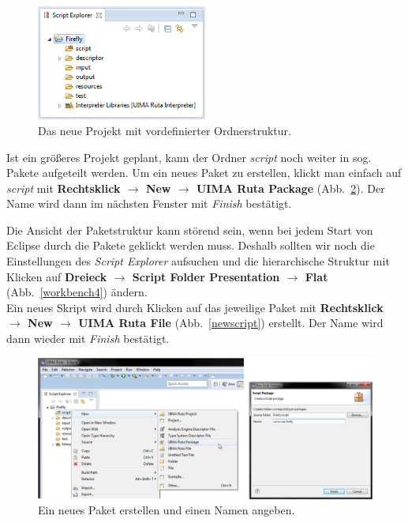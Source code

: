 \documentclass{article}
\begin{document}
\begin{figure}
\centering
\includegraphics[width=0.5\textwidth]{figs/capture(6).png}
\caption{Das neue Projekt mit vordefinierter Ordnerstruktur.}
\label{folders}
\end{figure}

Ist ein größeres Projekt geplant, kann der Ordner \textit{script} noch weiter in sog. Pakete aufgeteilt werden. Um ein neues Paket zu erstellen, klickt man einfach auf \textit{script} mit \textbf{Rechtsklick $\rightarrow$ New $\rightarrow$ UIMA Ruta Package} (Abb.~\ref{newpack}). Der Name wird dann im nächsten Fenster mit \textit{Finish} bestätigt.

Die Ansicht der Paketstruktur kann störend sein, wenn bei jedem Start von Eclipse durch die Pakete geklickt werden muss. Deshalb sollten wir noch die Einstellungen des \textit{Script Explorer} aufsuchen und die hierarchische Struktur mit Klicken auf \textbf{Dreieck $\rightarrow$ Script Folder Presentation $\rightarrow$ Flat} (Abb.~\ref{workbench4}) ändern.\\
Ein neues Skript wird durch Klicken auf das jeweilige Paket mit \textbf{Rechtsklick $\rightarrow$ New $\rightarrow$ UIMA Ruta File} (Abb.~\ref{newscript}) erstellt. Der Name wird dann wieder mit \textit{Finish} bestätigt.

\begin{figure}
\centering
\includegraphics[width=1\textwidth]{figs/capture(7+8).png}
\caption{Ein neues Paket erstellen und einen Namen angeben.}
\label{newpack}
\end{figure}
\end{document}
